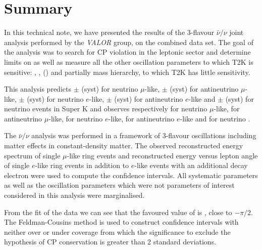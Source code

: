 \clearpage


\section{Summary}
\label{sec:summary}

In this technical note, we have presented the results of the 3-flavour $\bar{\nu}/\nu$ joint analysis performed by the {\em VALOR} group, on the combined \RunPeriod data set. The goal of the analysis was to search for CP violation in the leptonic sector and determine limits on \deltacp as well as measure all the other oscillation parameters to which T2K is sensitive: \ssqthonethree, \ssqthtwothree, \dmsqtwothree (\dmsqonethree) and partially mass hierarchy, to which T2K has little sensitivity.

This analysis predicts
\NskOscExpectationNumuRunOneEight{} $\pm$ \NskOscExpectationNumuErrorRunOneEight{} (syst) for neutrino $\mu$-like, \NskOscExpectationNumuBarRunOneEight{} $\pm$ \NskOscExpectationNumuBarErrorRunOneEight{} (syst) for antineutrino $\mu$-like, \NskOscExpectationNueRunOneEight{} $\pm$ \NskOscExpectationNueErrorRunOneEight{} (syst) for neutrino $e$-like, \NskOscExpectationNueBarRunOneEight{} $\pm$ \NskOscExpectationNueBarErrorRunOneEight{} (syst) for antineutrino $e$-like and \NskOscExpectationNueCConepiRunOneEight{} $\pm$ \NskOscExpectationNueCConepiErrorRunOneEight{} (syst) for neutrino \nueCConepi{} events in Super K and observes respectively \NskObservedNumuRunOneEight{} for neutrino $\mu$-like, \NskObservedNumuBarRunOneEight{}  for antineutrino $\mu$-like, \NskObservedNueRunOneEight{}  for neutrino $e$-like, \NskObservedNueBarRunOneEight{}  for antineutrino $e$-like and \NskObservedNueCConepiRunOneEight{} for neutrino \nueCConepi{}. 

The $\bar{\nu}/\nu$ analysis was performed in a framework of 3-flavour oscillations including matter effects in constant-density matter. The observed reconstructed energy spectrum of single $\mu$-like ring events and reconstructed energy versus lepton angle of single $e$-like ring events in addition to $e$-like events with an additional decay electron were used to compute the confidence intervals. All \NSyst{} systematic parameters as well as the oscillation parameters which were not parameters of interest considered in this analysis were marginalised.

From the fit of the \RunPeriod data we can see that the favoured value of \deltacp is \BestFitDeltacpwRCb, close to $-\pi/2$. The Feldman-Cousins method is used to construct confidence intervals with neither over or under coverage from which the significance to exclude the hypothesis of CP conservation is greater than 2 standard deviations. 

\clearpage

